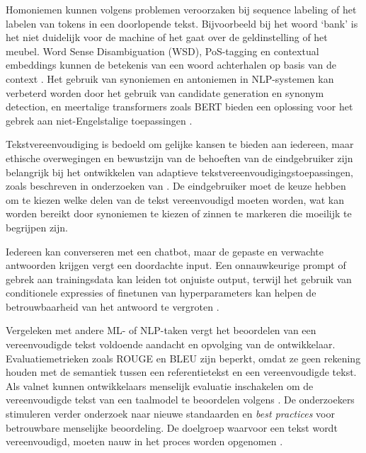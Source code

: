\medspace 

Homoniemen kunnen volgens \textcite{Roldos2020} problemen veroorzaken bij sequence labeling of het labelen van tokens in een doorlopende tekst. Bijvoorbeeld bij het woord ‘bank’ is het niet duidelijk voor de machine of het gaat over de geldinstelling of het meubel. Word Sense Disambiguation (WSD), PoS-tagging en contextual embeddings kunnen de betekenis van een woord achterhalen op basis van de context \autocite{Eisenstein2019, Liu2020}. Het gebruik van synoniemen en antoniemen in NLP-systemen kan verbeterd worden door het gebruik van candidate generation en synonym detection, en meertalige transformers zoals BERT bieden een oplossing voor het gebrek aan niet-Engelstalige toepassingen \autocite{Dandekar2016, Roldos2020}.

\medspace

Tekstvereenvoudiging is bedoeld om gelijke kansen te bieden aan iedereen, maar ethische overwegingen en bewustzijn van de behoeften van de eindgebruiker zijn belangrijk bij het ontwikkelen van adaptieve tekstvereenvoudigingstoepassingen, zoals beschreven in onderzoeken van \textcite{Niemeijer2010, Xu2015, Gooding2022}. De eindgebruiker moet de keuze hebben om te kiezen welke delen van de tekst vereenvoudigd moeten worden, wat kan worden bereikt door synoniemen te kiezen of zinnen te markeren die moeilijk te begrijpen zijn.

\medspace

Iedereen kan converseren met een chatbot, maar de gepaste en verwachte antwoorden krijgen vergt een doordachte input. Een onnauwkeurige prompt of gebrek aan trainingsdata kan leiden tot onjuiste output, terwijl het gebruik van conditionele expressies of finetunen van hyperparameters kan helpen de betrouwbaarheid van het antwoord te vergroten \autocite{Miszczak2023, Jiang2023}.

\medspace

Vergeleken met andere ML- of NLP-taken vergt het beoordelen van een vereenvoudigde tekst voldoende aandacht en opvolging van de ontwikkelaar. Evaluatiemetrieken zoals ROUGE en BLEU zijn beperkt, omdat ze geen rekening houden met de semantiek tussen een referentietekst en een vereenvoudigde tekst. Als valnet kunnen ontwikkelaars menselijk evaluatie inschakelen om de vereenvoudigde tekst van een taalmodel te beoordelen volgens \textcite{Fabbri2020}. De onderzoekers stimuleren verder onderzoek naar nieuwe standaarden en \textit{best practices} voor betrouwbare menselijke beoordeling. De doelgroep waarvoor een tekst wordt vereenvoudigd, moeten nauw in het proces worden opgenomen \autocite{Iskender2021}.


